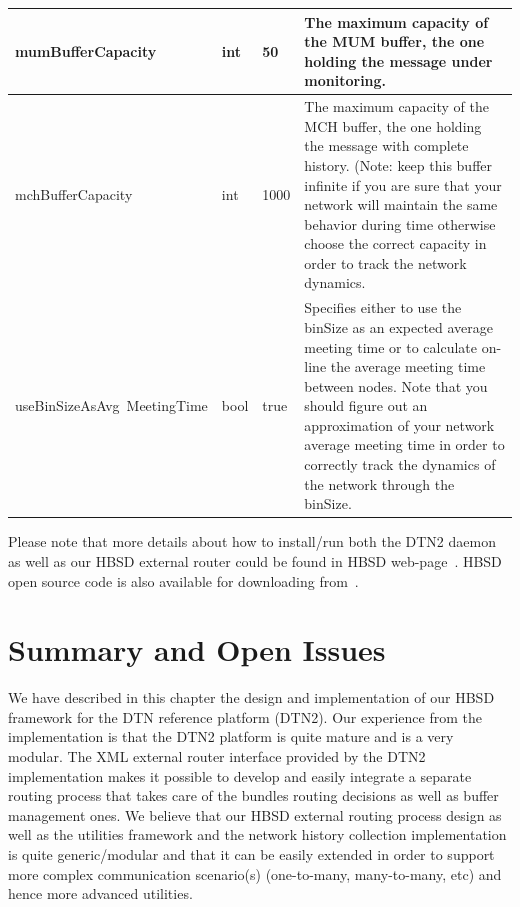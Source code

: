 \begin{longtable}[!h]{|p{4cm}|p{1cm}|p{2cm}|p{5cm}|}
\hline
mumBufferCapacity & int & 50& The maximum capacity of the MUM buffer, the one holding the message under monitoring. \\
\hline
mchBufferCapacity & int & 1000 & The maximum capacity of the MCH buffer, the one holding the message with complete history. 
(Note: keep this  buffer infinite if you are sure that your network will maintain the same behavior during time otherwise choose the correct capacity in order to track the network dynamics.\\
\hline
useBinSizeAsAvg\ MeetingTime & bool & true& Specifies either to use the binSize as an expected average meeting time or to calculate on-line the average meeting time between nodes. Note that you should figure out an approximation of your network average meeting time in order to correctly track the dynamics of the network  through the binSize.\\
\hline
\end{longtable}

Please note that more details about how to install/run both the DTN2 daemon as well as our HBSD external router could be found in HBSD web-page~\cite{HBSDDTN2}. HBSD open source code is also available for downloading from~\cite{HBSDDTN2}. 

\section{Summary and Open Issues}

We have described in this chapter the design and implementation of our HBSD framework for the DTN reference platform (DTN2). Our experience from the implementation is that the DTN2 platform is quite mature and is a very modular. The XML external router interface provided by the DTN2 implementation makes it possible to develop and easily integrate a separate routing process that takes care of the bundles routing decisions as well as buffer management ones. We believe that our HBSD external routing process design as well as the utilities framework and the network history collection implementation is quite generic/modular and that it can be easily extended in order to support more complex communication scenario(s) (one-to-many, many-to-many, etc) and hence more advanced utilities.  

